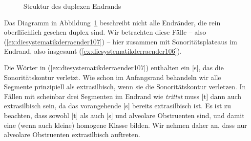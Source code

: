 \begin{figure}[!htbp]
  \caption{Struktur des duplexen Endrands}
  \label{fig:diesystematikderraender105}
\end{figure}

Das Diagramm in Abbildung~\ref{fig:diesystematikderraender105} beschreibt nicht alle Endränder, die rein oberflächlich gesehen duplex sind.
Wir betrachten diese Fälle -- also (\ref{ex:diesystematikderraender107}) -- hier zusammen mit Sonoritätsplateaus im Endrand, also insgesamt (\ref{ex:diesystematikderraender106}).

\begin{exe}
  \ex \label{ex:diesystematikderraender106}
  \begin{xlist}
  \end{xlist}
\end{exe}

Die Wörter in (\ref{ex:diesystematikderraender107}) enthalten ein [s], das die Sonoritätskontur verletzt.
Wie schon im Anfangsrand behandeln wir alle Segmente prinzipiell als extrasilbisch, wenn sie die Sonoritätskontur verletzen.
In Fällen mit scheinbar drei Segmenten im Endrand wie \textit{trittst} muss [t] dann auch extrasilbisch sein, da das vorangehende [s] bereits extrasilbisch ist.
Es ist zu beachten, dass sowohl [t] als auch [s] und \textipa{[S]} alveolare Obstruenten sind, und damit eine (wenn auch kleine) homogene Klasse bilden.
Wir nehmen daher an, dass nur alveolare Obstruenten extrasilbisch auftreten.

